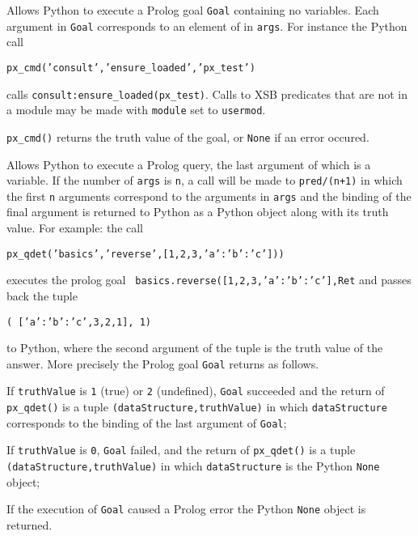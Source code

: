 \begin{description}

%
  Allows Python to execute a Prolog goal {\tt Goal} containing no
  variables.  Each argument in {\tt Goal} corresponds to an element of
  in {\tt args}.  For instance the Python call

  {\tt px\_cmd('consult','ensure\_loaded','px\_test')}

  calls {\tt consult:ensure\_loaded(px\_test)}.  Calls to XSB
  predicates that are not in a module may be made with {\tt module}
  set to {\tt usermod}.

  {\tt px\_cmd()} returns the truth value of the goal, or {\tt None}
  if an error occured.
  
%
  Allows Python to execute a Prolog query, the last argument of which
  is a variable.  If the number of {\tt args} is {\tt n}, a call will
  be made to {\tt pred/(n+1)} in which the first {\tt n} arguments
  correspond to the arguments in {\tt args} and the binding of the
  final argument is returned to Python as a Python object along with
  its truth value.  For example: the call

  {\tt px\_qdet('basics','reverse',[1,2,3,{'a':{'b':'c'}}]))}

  \noindent
  executes the prolog goal {\tt
    basics.reverse([1,2,3,{'a':{'b':'c'}}],Ret} and passes back the tuple

  {\tt ( [{'a':{'b':'c'}},3,2,1], 1)}

  \noindent
  to Python, where the second argument of the tuple is the truth value
  of the answer.  More precisely the Prolog goal {\tt Goal} returns as
  follows.

  \bi
  \item If {\tt truthValue} is {\tt 1} (true) or {\tt 2} (undefined),
    {\tt Goal} succeeded and the return of {\tt px\_qdet()} is a tuple
    {\tt (dataStructure,truthValue)} in which {\tt dataStructure}
    corresponds to the binding of the last argument of {\tt Goal};
   \item If {\tt truthValue} is {\tt 0}, {\tt Goal} failed, and the
     return of {\tt px\_qdet()} is a tuple {\tt
       (dataStructure,truthValue)} in which {\tt dataStructure} is the
     Python {\tt None} object;
   \item If the execution of {\tt Goal} caused a Prolog error the
     Python {\tt None} object is returned.
     \ei


\end{description}
